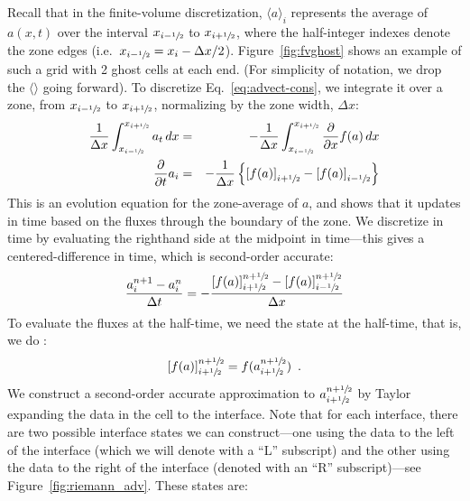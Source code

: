 Recall that in the finite-volume discretization, $\langle a\rangle_i$
represents the average of $a(x,t)$ over the interval $x_{i-{\sfrac{1}{2}}}$ to
$x_{i+{\sfrac{1}{2}}}$, where the half-integer indexes denote the zone edges
(i.e.\ $x_{i-{\sfrac{1}{2}}} = x_i - \Delta x/2$).  Figure~\ref{fig:fvghost}
shows an example of such a grid with 2 ghost cells at each end.  (For
simplicity of notation, we drop the $\langle \rangle$ going forward).
To discretize Eq.~\ref{eq:advect-cons}, we integrate it over a zone,
from ${x_{i-{\sfrac{1}{2}}}}$ to ${x_{i+{\sfrac{1}{2}}}}$, normalizing by the zone width,
$\Delta x$:
\begin{eqnarray}
\frac{1}{\Delta x} \int_{x_{i-{\sfrac{1}{2}}}}^{x_{i+{\sfrac{1}{2}}}} a_t \, dx &=& 
   - \frac{1}{\Delta x} \int_{x_{i-{\sfrac{1}{2}}}}^{x_{i+{\sfrac{1}{2}}}} \frac{\partial}{\partial x} f(a) \, dx \\
\frac{\partial}{\partial t} a_i &=& 
   - \frac{1}{\Delta x} \left \{ \left [f(a) \right ]_{i+{\sfrac{1}{2}}} - \left [f(a) \right ]_{i-{\sfrac{1}{2}}} \right \}
\end{eqnarray}
This is an evolution equation for the zone-average of $a$, and shows
that it updates in time based on the fluxes through the boundary of
the zone.  We discretize in time by evaluating the righthand side at
the midpoint in time---this gives a centered-difference in time, which
is second-order accurate:
\begin{equation}
\frac{a_i^{n+1} - a_i^n}{\Delta t} = -\frac{\left [f(a) \right ]_{i+{\sfrac{1}{2}}}^{n+{\sfrac{1}{2}}} - \left [f(a) \right ]_{i-{\sfrac{1}{2}}}^{n+{\sfrac{1}{2}}}}{\Delta x}
\label{eq:consupdate1d}
\end{equation}
To evaluate the fluxes at the half-time, we need the state at the
half-time, that is, we do :
\begin{equation}
\label{adv:eq:fluxeval}
\left [f(a) \right ]_{i+{\sfrac{1}{2}}}^{n+{\sfrac{1}{2}}} = f(a_{i+{\sfrac{1}{2}}}^{n+{\sfrac{1}{2}}}) \enskip .
\end{equation}
We construct a second-order accurate approximation to
$a_{i+{\sfrac{1}{2}}}^{n+{\sfrac{1}{2}}}$ by Taylor expanding the data in the cell to the
interface.  Note that for each interface, there are two possible
interface states we can construct---one using the data to the left of
the interface (which we will denote with a ``L'' subscript) and the
other using the data to the right of the interface (denoted with an
``R'' subscript)---see Figure~\ref{fig:riemann_adv}.  These states are:
